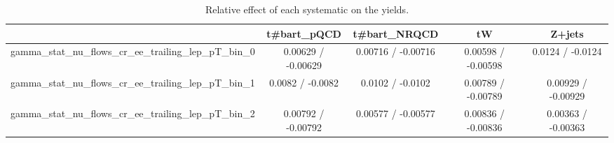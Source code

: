 \documentclass[10pt]{article}
\begin{document}
\begin{table}[htbp]
\begin{center}
\begin{tabular}{|c|c|c|c|c|}
\hline 
      & t#bar{t}_{pQCD}      & t#bar{t}_{NRQCD}      & tW      & Z+jets \\ 
\hline 
  gamma_stat_nu_flows_cr_ee_trailing_lep_pT_bin_0 & 0.00629 / -0.00629 & 0.00716 / -0.00716 & 0.00598 / -0.00598 & 0.0124 / -0.0124 \\ 
  gamma_stat_nu_flows_cr_ee_trailing_lep_pT_bin_1 & 0.0082 / -0.0082 & 0.0102 / -0.0102 & 0.00789 / -0.00789 & 0.00929 / -0.00929 \\ 
  gamma_stat_nu_flows_cr_ee_trailing_lep_pT_bin_2 & 0.00792 / -0.00792 & 0.00577 / -0.00577 & 0.00836 / -0.00836 & 0.00363 / -0.00363 \\ 
\hline 
\end{tabular} 
\caption{Relative effect of each systematic on the yields.} 
\end{center} 
\end{table} 
\end{document}
